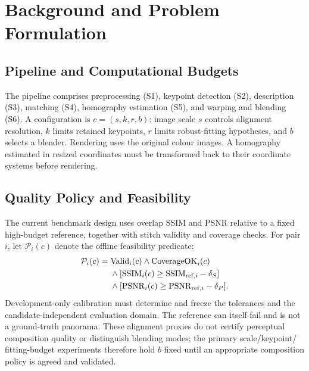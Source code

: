\documentclass[a4paper,UKenglish,cleveref,autoref,anonymous]{oasics-v2021}
\begin{document}
\section{Background and Problem Formulation}
\label{sec:problem}
\subsection{Pipeline and Computational Budgets}
The pipeline comprises preprocessing (S1), keypoint detection (S2), description
(S3), matching (S4), homography estimation (S5), and warping and blending (S6).
A configuration is $c=(s,k,r,b)$: image scale $s$ controls alignment resolution,
$k$ limits retained keypoints, $r$ limits robust-fitting hypotheses, and $b$
selects a blender. Rendering uses the original colour images. A homography
estimated in resized coordinates must be transformed back to their coordinate
systems before rendering.

\subsection{Quality Policy and Feasibility}
\label{sec:quality}
The current benchmark design uses overlap SSIM and PSNR relative to a fixed
high-budget reference, together with stitch validity and coverage checks.
For pair $i$, let $\mathcal{P}_i(c)$ denote the offline feasibility predicate:
\begin{align}
\mathcal{P}_i(c) ={}& \mathrm{Valid}_i(c)\land\mathrm{CoverageOK}_i(c) \notag\\
 &{}\land[\mathrm{SSIM}_i(c)\geq\mathrm{SSIM}_{\mathrm{ref},i}-\delta_S] \notag\\
 &{}\land[\mathrm{PSNR}_i(c)\geq\mathrm{PSNR}_{\mathrm{ref},i}-\delta_P].
\label{eq:quality}
\end{align}
Development-only calibration must determine and freeze the tolerances and the
candidate-independent evaluation domain. The reference can itself fail and is
not a ground-truth panorama. These alignment proxies do not certify perceptual
composition quality or distinguish blending modes; the primary scale/keypoint/
fitting-budget experiments therefore hold $b$ fixed until an appropriate
composition policy is agreed and validated.
\end{document}
